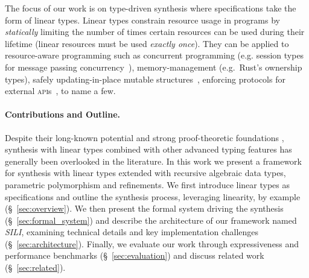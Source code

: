 \documentclass{llncs}
\newcommand{\synname}{\emph{SILI}}
\begin{document}
The focus of our work is on type-driven synthesis where specifications take the
form of linear types.
%
%
Linear types constrain resource
usage in programs by \emph{statically} limiting the number of times certain
resources can be used during their lifetime (linear resources must be used
\emph{exactly once}).
%
They can be applied to resource-aware programming such as concurrent programming
(e.g. session types for message passing
concurrency~\cite{DBLP:journals/mscs/CairesPT16}), memory-management
(e.g.~Rust's ownership types), safely updating-in-place mutable
structures~\cite{Bernardy_2018}, enforcing protocols for external \textsc{api}s~\cite{Bernardy_2018}, to name a few.

\paragraph{Contributions and Outline.} Despite their long-known potential
\cite{Wadler90lineartypes,DBLP:journals/mscs/CairesPT16,Bernardy_2018}
and strong proof-theoretic
foundations
\cite{10.1093/logcom/2.3.297,DBLP:conf/cade/ChaudhuriP05,DBLP:journals/tcs/CervesatoHP00},
synthesis with linear types combined with other advanced typing features
has generally been overlooked in the literature.  In this work we present a framework for synthesis
with linear types extended with recursive algebraic data types, parametric
polymorphism and refinements.
We first introduce linear types as specifications
and outline the synthesis process, leveraging linearity, by example
(\S~\ref{sec:overview}). We then present the formal system driving the
synthesis (\S~\ref{sec:formal_system}) and describe the architecture
of our framework named \synname, examining technical details and key
implementation challenges (\S~\ref{sec:architecture}). Finally,
we evaluate our work through expressiveness and performance benchmarks
(\S~\ref{sec:evaluation}) and discuss related work (\S~\ref{sec:related}).
\end{document}
